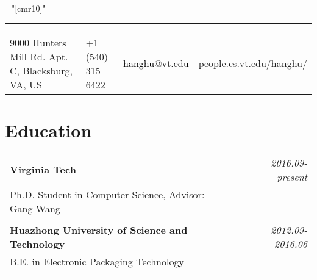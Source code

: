 \documentclass[a4paper,10pt]{article}
\begin{document}
\pagestyle{empty} %

\font\fb="[cmr10]" %
\bigskip

\hrule height 0.7mm \vspace{-0.4em}
\begin{tabular}{p{7.0cm}p{2.8cm}p{3.0cm}p{3.0cm}}
 {\small 9000 Hunters Mill Rd. Apt. C, Blacksburg, VA, US}
&  {\small +1 (540) 315 6422}
& {\small \href{mailto:hanghu@vt.edu}{\textcolor{black}{hanghu@vt.edu}}}
&{\small people.cs.vt.edu/hanghu/}
   \\
\end{tabular}


\section{Education}
\begin{tabular}{p{13.5cm}p{0.5cm}r}

\textbf{Virginia Tech} && \emph{2016.09-present} \\
\hspace{1em} Ph.D. Student in Computer Science, Advisor: Gang Wang && \vspace{-0.5em} \\
\multicolumn{3}{c}{} \\

\textbf{Huazhong University of Science and Technology} && \emph{2012.09-2016.06} \\
\hspace{1em} B.E. in Electronic Packaging Technology && \vspace{-0.5em} \\

\multicolumn{3}{c}{} \\
\end{tabular}
\end{document}
